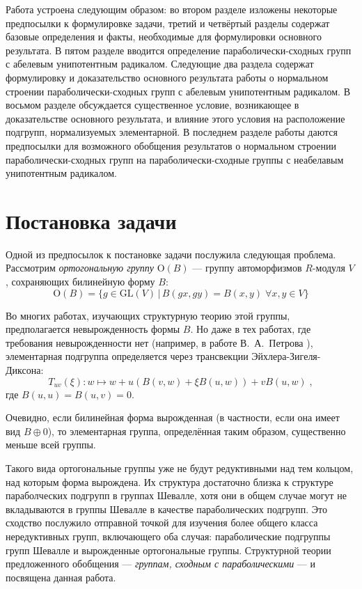 \documentclass[12pt]{matmex-diploma}
\theoremstyle{mystyleni}
\theoremstyle{mystyle}
\begin{document}
Работа устроена следующим образом: во втором разделе изложены некоторые предпосылки к формулировке задачи, третий и четвёртый разделы содержат базовые определения и факты, необходимые для формулировки основного результата. В пятом разделе вводится определение параболически-сходных групп с абелевым унипотентным радикалом. Следующие два раздела содержат формулировку и доказательство основного результата работы о нормальном строении параболически-сходных групп с абелевым унипотентным радикалом. В восьмом разделе обсуждается существенное условие, возникающее в доказательстве основного результата, и влияние этого условия на расположение подгрупп, нормализуемых элементарной.
В последнем разделе работы даются предпосылки для возможного обобщения результатов о нормальном строении параболически-сходных групп на параболически-сходные группы с неабелавым унипотентным радикалом.


\section{Постановка задачи}

Одной из предпосылок к постановке задачи послужила следующая проблема. 
Рассмотрим \emph{ортогональную группу} $\mathrm{O}(B)$ --- группу автоморфизмов $R$-модуля $V$, сохраняющих билинейную форму $B$:
$$ \mathrm{O}(B) = \{ g \in \mathrm{GL}(V) \,|\, B(gx,gy) = B(x,y) \; \forall x,y \in V \} $$

Во многих работах, изучающих структурную теорию этой группы, предполагается невырожденность формы $B$.
Но даже в тех работах, где требования невырожденности нет (например, в работе В.~А.~Петрова \cite{Petrov2005}), элементарная подгруппа определяется через трансвекции Эйхлера-Зигеля-Диксона:
$$ T_{uv}(\xi) : w \mapsto w + u (B(v,w) + \xi B(u,w)) + v B(u,w) \;, $$
где $ B(u,u) = B(u,v) = 0$.

Очевидно, если билинейная форма вырожденная (в частности, если она имеет вид $B \oplus 0$), то элементарная группа, определённая таким образом, существенно меньше всей группы.

Такого вида ортогональные группы уже не будут редуктивными над тем кольцом, над которым форма вырождена. Их структура достаточно близка к структуре параболческих подгрупп в группах Шевалле, хотя они в общем случае могут не вкладываются в группы Шевалле в качестве параболических подгрупп. Это сходство послужило отправной точкой для изучения более общего класса нередуктивных групп, включающего оба случая: параболические подгруппы групп Шевалле и вырожденные ортогональные группы. Структурной теории предложенного обобщения --- \emph{группам, сходным с параболическими} --- и посвящена данная работа.
\end{document}
